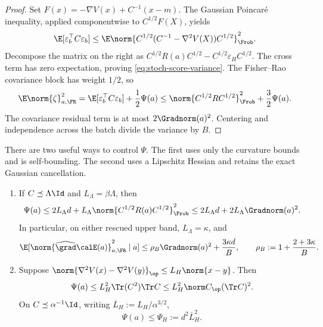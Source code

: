 \begin{proof}
Set \(F(x)=-\nabla V(x)+C^{-1}(x-m)\).  The Gaussian Poincar\'e inequality,
applied componentwise to \(C^{1/2}F(X)\), yields
\[
  \E[\varepsilon_b^\top C\varepsilon_b]
  \leq\E\norm{C^{1/2}(C^{-1}-\nabla^2V(X))C^{1/2}}_{\Frob}^2.
\]
Decompose the matrix on the right as
\(C^{1/2}R(a)C^{1/2}-C^{1/2}\varepsilon_HC^{1/2}\).
The cross term has zero expectation, proving
\eqref{eq:stoch-score-variance}.  The Fisher--Rao covariance block has
weight \(1/2\), so
\[
  \E\norm{\zeta}_{a,\FR}^2
  =\E[\varepsilon_b^\top C\varepsilon_b]+\frac12\Psi(a)
  \leq\norm{C^{1/2}RC^{1/2}}_{\Frob}^2+\frac32\Psi(a).
\]
The covariance residual term is at most \(2\Gradnorm(a)^2\).  Centering and
independence across the batch divide the variance by \(B\).
\end{proof}

There are two useful ways to control \(\Psi\).  The first uses only the
curvature bounds and is self-bounding.  The second uses a Lipschitz Hessian
and retains the exact Gaussian cancellation.

\begin{lemma}
\label{lem:stoch-fluctuation-regimes}
\begin{enumerate}[label=\textup{(\roman*)}]
\item If \(C\preceq\Lambda\Id\) and \(L_\Lambda=\beta\Lambda\), then
\begin{equation}
  \Psi(a)
  \leq2L_\Lambda d
    +L_\Lambda\norm{C^{1/2}R(a)C^{1/2}}_{\Frob}^2
  \leq2L_\Lambda d+2L_\Lambda\Gradnorm(a)^2.
  \label{eq:stoch-Psi-selfbound}
\end{equation}
In particular, on either rescued upper band, \(L_\Lambda=\kappa\), and
\begin{equation}
  \E[\norm{\widehat{\grad}\calE(a)}_{a,\FR}^2\mid a]
  \leq\rho_B\Gradnorm(a)^2+\frac{3\kappa d}{B},
  \qquad
  \rho_B:=1+\frac{2+3\kappa}{B}.
  \label{eq:stoch-selfbounded-second-moment}
\end{equation}
\item Suppose
\(\norm{\nabla^2V(x)-\nabla^2V(y)}_{\op}\leq
L_H\norm{x-y}\).  Then
\begin{equation}
  \Psi(a)
  \leq L_H^2\Tr(C^2)\Tr C
  \leq L_H^2\norm C_{\op}(\Tr C)^2.
  \label{eq:stoch-Psi-anisotropic}
\end{equation}
On \(C\preceq\alpha^{-1}\Id\), writing
\(\overline L_H:=L_H/\alpha^{3/2}\),
\begin{equation}
  \Psi(a)\leq\Psi_H:=d^2\overline L_H^2.
  \label{eq:stoch-Psi-Hlip}
\end{equation}
\end{enumerate}
\end{lemma}

